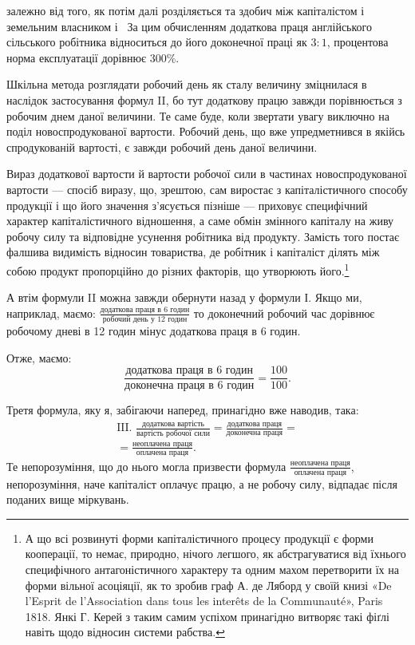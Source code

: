 \parcont{}  %
залежно від того, як потім далі розділяється та здобич між капіталістом
і земельним власником і~ За цим обчисленням
додаткова праця англійського сільського робітника відноситься
до його доконечної праці як $3 : 1$, процентова норма експлуатації
дорівнює 300\%.

Шкільна метода розглядати робочий день як сталу величину
зміцнилася в наслідок застосування формул II, бо тут додаткову
працю завжди порівнюється з робочим днем даної величини.
Те саме буде, коли звертати увагу виключно на поділ новоспродукованої
вартости. Робочий день, що вже упредметнився в якійсь
спродукованій вартості, є завжди робочий день даної величини.

Вираз додаткової вартости й вартости робочої сили в частинах
новоспродукованої вартости — спосіб виразу, що, зрештою,
сам виростає з капіталістичного способу продукції і що його
значення з’ясується пізніше — приховує специфічний характер
капіталістичного відношення, а саме обмін змінного капіталу
на живу робочу силу та відповідне усунення робітника від продукту.
Замість того постає фалшива видимість відносин товариства,
де робітник і капіталіст ділять між собою продукт пропорційно
до різних факторів, що утворюють його.\footnote{
А що всі розвинуті форми капіталістичного процесу продукції
є форми кооперації, то немає, природно, нічого легшого, як абстрагуватися
від їхнього специфічного антагоністичного характеру та одним
махом перетворити їх на форми вільної асоціяції, як то зробив граф
А. де Ляборд у своїй книзі «De l’Esprit de l’Association dans tous les
interêts de la Communauté», Paris 1818. Янкі Г. Керей з таким самим
успіхом принагідно витворяє такі фіґлі навіть щодо відносин системи
рабства.
}

А втім формули II можна завжди обернути назад у формули І.
Якщо ми, наприклад, маємо: $\frac{\text{додаткова праця в 6 годин}}{\text{робочий день у 12 годин}}$
то доконечний робочий час дорівнює робочому дневі в 12 годин мінус
додаткова праця в 6 годин.

Отже, маємо:\[
\frac{\text{додаткова праця в 6 годин}}{\text{доконечна праця в 6 годин}} = \frac{100}{100}\text{.}
\]

Третя формула, яку я, забігаючи наперед, принагідно вже
наводив, така:
\begin{gather*}
\text{III. }
\frac{\text{додаткова вартість}}{\text{вартість робочої сили}} =
\frac{\text{додаткова праця}}{\text{доконечна праця}} = \\
= \frac{\text{неоплачена праця}}{\text{оплачена праця}}
\text{.}
\end{gather*}
Те непорозуміння, що до нього могла призвести формула
$\frac{\text{неоплачена праця}}{\text{оплачена праця}}$, непорозуміння, наче капіталіст оплачує працю,
а не робочу силу, відпадає після поданих вище міркувань.
\parbreak{}  %
